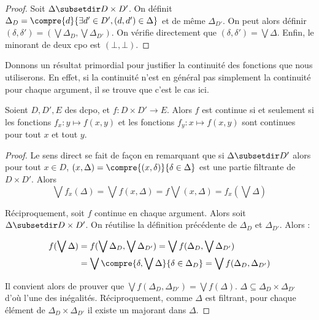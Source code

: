 \begin{proof}
    Soit $\Delta\subsetdir D\times D'$. On définit $\Delta_D=\compre{d}{\exists d'\in D', (d,d')\in\Delta}$ et de même $\Delta_{D'}$. On peut alors définir $(\delta,\delta')=(\bigvee \Delta_D,\bigvee \Delta_{D'})$. On vérifie directement que $(\delta,\delta')=\bigvee \Delta$. Enfin, le minorant de deux cpo est $(\bot,\bot)$.
\end{proof}

Donnons un résultat primordial pour justifier la continuité des fonctions que nous utiliserons. En effet, si la continuité n'est en général pas simplement la continuité pour chaque argument, il se trouve que c'est le cas ici.

\begin{prop}
    Soient $D,D',E$ des dcpo, et $f : D\times D'\to E$. Alors $f$ est continue si et seulement si les fonctions $f_x : y \mapsto f(x,y)$ et les fonctions $f_y : x\mapsto f(x,y)$ sont continues pour tout $x$ et tout $y$.
\end{prop}

\begin{proof}
    Le sens direct se fait de façon en remarquant que si $\Delta\subsetdir D'$ alors pour tout $x\in D$, $(x,\Delta)=\compre{(x,\delta)}{\delta\in\Delta}$ est une partie filtrante de $D\times D'$. Alors $$\bigvee f_x(\Delta)= \bigvee f(x,\Delta)=f\bigvee(x,\Delta)=f_x(\bigvee \Delta)$$
    
    Réciproquement, soit $f$ continue en chaque argument. Alors soit $\Delta\subsetdir D\times D'$. On réutilise la définition précédente de $\Delta_D$ et $\Delta_{D'}$. Alors :
    \begin{center}
        \begin{align*}
            f(\bigvee \Delta) &= f(\bigvee \Delta_D,\bigvee \Delta_{D'})=\bigvee f(\Delta_D,\bigvee\Delta_{D'})\\
            &= \bigvee \compre{\delta,\bigvee\Delta}{\delta\in \Delta_D} = \bigvee f(\Delta_D,\Delta_{D'})
        \end{align*}
    \end{center}
    
    Il convient alors de prouver que $\bigvee f(\Delta_D,\Delta_{D'})=\bigvee f(\Delta)$. $\Delta\subseteq \Delta_D\times\Delta_{D'}$ d'où l'une des inégalités. Réciproquement, comme $\Delta$ est filtrant, pour chaque élément de $\Delta_D\times \Delta_{D'}$ il existe un majorant dans $\Delta$.
\end{proof}

